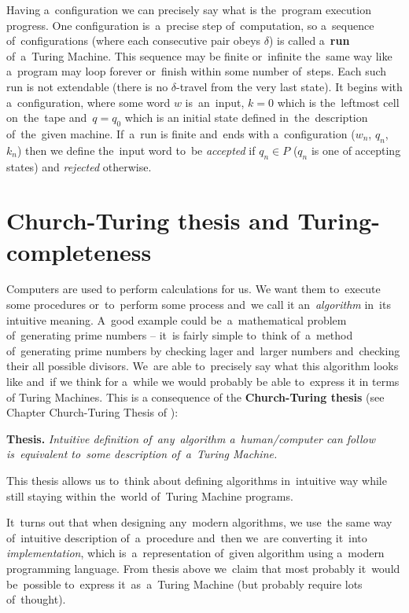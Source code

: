 \documentclass[english,shortabstract,mgr]{iithesis}
\begin{document}
Having a~configuration we can precisely say what is the~program execution progress.
One configuration is~a~precise step of~computation, so a~sequence of~configurations (where
each consecutive pair obeys $\delta$) is called
a~\textbf{run} of~a~Turing Machine. This sequence may be finite or~infinite the~same way like
a~program may loop forever or~finish within some number of~steps. Each such run is not extendable
(there is no $\delta$-travel from the very last state). It begins with
a~configuration, where some word $w$ is~an~input, $k = 0$ which is the~leftmost cell on~the~tape
and~$q = q_0$ which is an initial state defined in~the~description of~the~given machine. If~a~run is
finite and~ends with a~configuration ($w_n$, $q_n$, $k_n$) then we define the~input word to~be
\textit{accepted} if $q_n \in P$ ($q_n$ is one of accepting states) and \textit{rejected} otherwise.

\section{Church-Turing thesis and Turing-completeness}

Computers are used to perform calculations for us. We want them to~execute some
procedures or~to~perform some process and~we call it an~\textit{algorithm} in~its intuitive meaning.
A~good example could be~a~mathematical problem of~generating prime numbers -- it~is fairly simple
to~think of~a~method of~generating prime numbers by checking lager and~larger numbers and~checking
their all possible divisors. We~are able to~precisely say what this algorithm looks like and~if
we think for a~while we would probably be able to~express it in terms of Turing Machines. This
is a consequence of the \textbf{Church-Turing thesis} (see Chapter Church-Turing Thesis of \cite{sipser2012ChurchTuring}):

\textbf{Thesis.} \textit{Intuitive definition of~any~algorithm a~human/computer can follow is~equivalent
to~some description of~a~Turing Machine.}

This thesis allows us to~think about defining algorithms in~intuitive way while still staying
within the~world of~Turing Machine programs.

It~turns out that when designing any~modern algorithms, we use~the same way of~intuitive description
of~a~procedure and~then we~are converting it~into \textit{implementation}, which is~a~representation
of~given algorithm using a~modern programming language. From thesis above we~claim that most probably
it~would be~possible to~express it~as~a~Turing Machine (but probably require lots of~thought).
\end{document}
